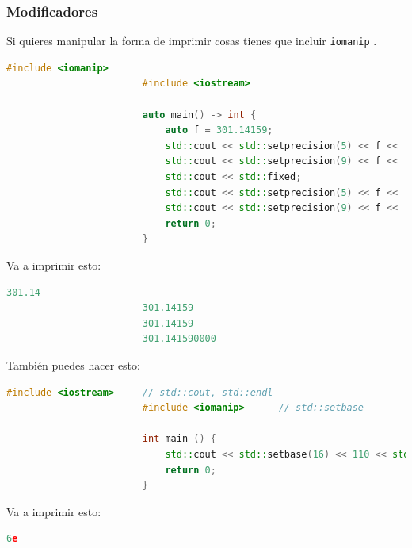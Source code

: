 \documentclass[12pt, fleqn]{report}                             %
\theoremstyle{break}                                            %
\newcommand{\textCode}[1]  { \texttt{#1} }                      %
\begin{document}
                \subsubsection{Modificadores}

                    Si quieres manipular la forma de imprimir cosas tienes que incluir 
                    \textCode{iomanip}. 

                    \begin{lstlisting}[language=C++, gobble=24]
                        #include <iomanip>
                        #include <iostream>

                        auto main() -> int {
                            auto f = 301.14159;
                            std::cout << std::setprecision(5) << f << '\n';
                            std::cout << std::setprecision(9) << f << '\n';
                            std::cout << std::fixed;
                            std::cout << std::setprecision(5) << f << '\n';
                            std::cout << std::setprecision(9) << f << '\n';
                            return 0;
                        }
                    \end{lstlisting}

                    Va a imprimir esto:
                    \begin{lstlisting}[language=C++, gobble=24]
                        301.14
                        301.14159
                        301.14159
                        301.141590000
                    \end{lstlisting}

                    También puedes hacer esto:
                    \begin{lstlisting}[language=C++, gobble=24]
                        #include <iostream>     // std::cout, std::endl
                        #include <iomanip>      // std::setbase

                        int main () {
                            std::cout << std::setbase(16) << 110 << std::endl;
                            return 0;
                        }
                    \end{lstlisting}

                    Va a imprimir esto:
                    \begin{lstlisting}[language=C++, gobble=24]
                        6e
                    \end{lstlisting}

                    \cite{CPPReference}
\end{document}
